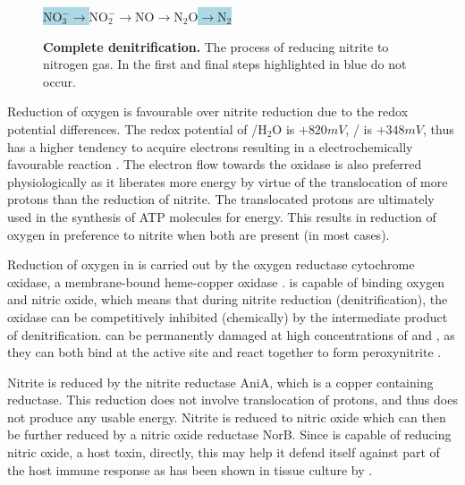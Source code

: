 \begin{figure}[tbp]
	\begin{center}
	\colorbox{LightBlue}{$\mathrm{NO}_3^-\rightarrow$}$\mathrm{NO}_2^-\rightarrow\mathrm{NO}\rightarrow\mathrm{N}_2\mathrm{O}$\colorbox{LightBlue}{$\rightarrow\mathrm{N}_2$}
	\caption[{\bf Complete denitrification.}]{{\bf Complete denitrification.} The process of reducing nitrite to nitrogen gas. In \Nm{} the first and final steps highlighted in blue do not occur.
	\label{fig:completedenitrification}}
	\end{center}
\end{figure}

Reduction of oxygen is favourable over nitrite reduction due to the redox potential differences. The redox potential of \cOxygen{}/H$_{\textrm{2}}$O is $+820mV$, \cNitrite{}/\cNO{} is $+348mV$, thus \cOxygen{} has a higher tendency to acquire electrons resulting in a electrochemically favourable reaction \cite{Deeudom2007}. The electron flow towards the oxidase is also preferred physiologically as it liberates more energy by virtue of the translocation of more protons than the reduction of nitrite. The translocated protons are ultimately used in the synthesis of ATP molecules for energy. This results in reduction of oxygen in preference to nitrite when both are present (in most cases).

Reduction of oxygen in \Nm{} is carried out by the oxygen reductase cytochrome \cbbthree{} oxidase, a membrane-bound heme-copper oxidase \cite{Preisig1996}. \cbbthree{} is capable of binding oxygen and nitric oxide, which means that during nitrite reduction (denitrification), the oxidase can be competitively inhibited (chemically) by the intermediate product of denitrification. \cbbthree{} can be permanently damaged at high concentrations of \cNO{} and \cOxygen{}, as they can both bind at the \cbbthree{} active site and react together to form peroxynitrite \cite{Brown1994,Sharpe1998,Anjum2002}.

Nitrite is reduced by the nitrite reductase AniA, which is a copper containing reductase. This reduction does not involve translocation of protons, and thus does not produce any usable energy. Nitrite is reduced to nitric oxide which can then be further reduced by a nitric oxide reductase NorB. Since \Nm{} is capable of reducing nitric oxide, a host toxin, directly, this may help it defend itself against part of the host immune response \cite{Heurlier2008,Rock2005} as has been shown in tissue culture by \citet{Anjum2002}.

